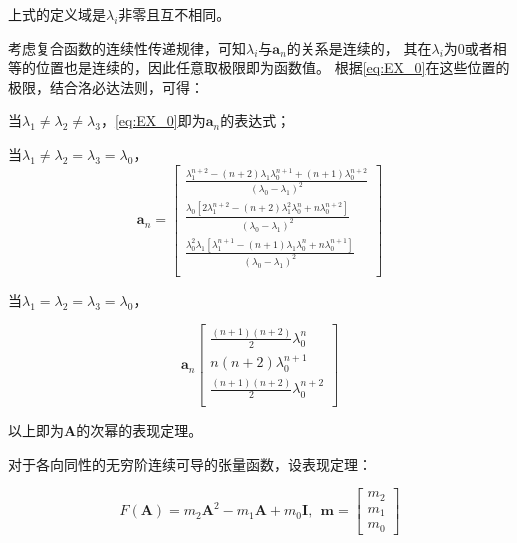 \documentclass[UTF8,zihao=5]{ctexart}
\newcommand{\bm}[1]{{\mathbf{#1}}}
\begin{document}
上式的定义域是$\lambda_i$非零且互不相同。


考虑复合函数的连续性传递规律，可知$\lambda_i$与$\bm{a}_n$的关系是连续的，
其在$\lambda_i$为0或者相等的位置也是连续的，因此任意取极限即为函数值。
根据\eqref{eq:EX_0}在这些位置的极限，结合洛必达法则，可得：

当$\lambda_1\neq\lambda_2\neq\lambda_3$，\eqref{eq:EX_0}即为$\bm{a}_n$的表达式；

当$\lambda_1\neq\lambda_2=\lambda_3=\lambda_0$，
\begin{equation}
    \bm{a}_n=\begin{bmatrix}
        \frac{\lambda_1^{n+2}-(n+2)\lambda_1\lambda_0^{n+1}+(n+1)\lambda_0^{n+2}}{(\lambda_0-\lambda_1)^2}\\
        \frac{
            \lambda_0\left[
                2\lambda_1^{n+2}-(n+2)\lambda_1^2\lambda_0^{n}+n\lambda_0^{n+2}
                \right]
                }{(\lambda_0-\lambda_1)^2}\\
        \frac{
            \lambda_0^2\lambda_1
            \left[
            \lambda_1^{n+1}-(n+1)\lambda_1\lambda_0^{n}+n\lambda_0^{n+1}
            \right]
            }{(\lambda_0-\lambda_1)^2}\\
    \end{bmatrix}
    \label{eq:EX_1}
\end{equation}

当$\lambda_1=\lambda_2=\lambda_3=\lambda_0$，

\begin{equation}
    \bm{a}_n
    \begin{bmatrix}
        \frac{(n+1)(n+2)}{2}\lambda_0^{n}\\
        n(n+2)\lambda_0^{n+1}\\
        \frac{(n+1)(n+2)}{2}\lambda_0^{n+2}\\
    \end{bmatrix}
    \label{eq:EX_2}
\end{equation}

以上即为$\bm{A}$的次幂的表现定理。

对于各向同性的无穷阶连续可导的张量函数，设表现定理：

\begin{equation}
    F(\bm{A})=m_2\bm{A}^2-m_1\bm{A}+m_0\bm{I},\ \ \bm{m}=\begin{bmatrix}
        m_2\\m_1\\m_0
    \end{bmatrix}
\end{equation}
\end{document}
